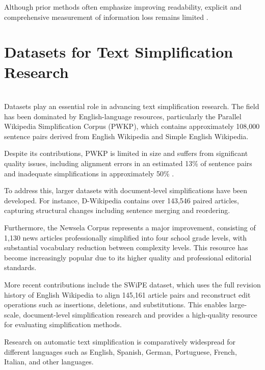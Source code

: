\documentclass{DESSThesis}
\begin{document}
Although prior methods often emphasize improving readability, explicit and comprehensive measurement of information loss remains limited \cite{cripwell2024evaluating}.  

\section{Datasets for Text Simplification Research}\\

Datasets play an essential role in advancing text simplification research. The field has been dominated by English-language resources, particularly the Parallel Wikipedia Simplification Corpus (PWKP), which contains approximately 108,000 sentence pairs derived from English Wikipedia and Simple English Wikipedia\cite{zhu2010monolingual,xu-etal-2015-problems}. 

Despite its contributions, PWKP is limited in size and suffers from significant quality issues, including alignment errors in an estimated 13\% of sentence pairs \cite{saggion2022text} and inadequate simplifications in approximately 50\% \cite{saggion2022text, xu-etal-2015-problems}.

To address this, larger datasets with document-level simplifications have been developed. For instance, D-Wikipedia \cite{DBLP:journals/corr/abs-2110-05071} contains over 143,546 paired articles, capturing structural changes including sentence merging and reordering. 

Furthermore, the Newsela  Corpus represents a major improvement, consisting of 1,130 news articles professionally simplified into four school grade levels, with substantial vocabulary reduction between complexity levels. This resource has become increasingly popular due to its higher quality and professional editorial standards\cite{rennes-2020-simpler,xu-etal-2015-problems}. 

More recent contributions include the SWiPE dataset, which uses the full revision history of English Wikipedia to align 145,161 article pairs and reconstruct edit operations such as insertions, deletions, and substitutions\cite{laban2023swipedatasetdocumentlevelsimplification}. This enables large-scale, document-level simplification research and provides a high-quality resource for evaluating simplification methods\cite{laban2023swipedatasetdocumentlevelsimplification}.

Research on automatic text simplification is comparatively widespread for different languages such as English\cite{zhu2010monolingual}, Spanish\cite{saggion2015making}, German\cite{DBLP:journals/corr/abs-2110-05071, ebling2022automatic}, Portuguese\cite{aluisio2010fostering}, French\cite{brouwers2014syntactic}, Italian\cite{barlacchi2013ernesta,nozza2023really}, and other languages. 
\end{document}
